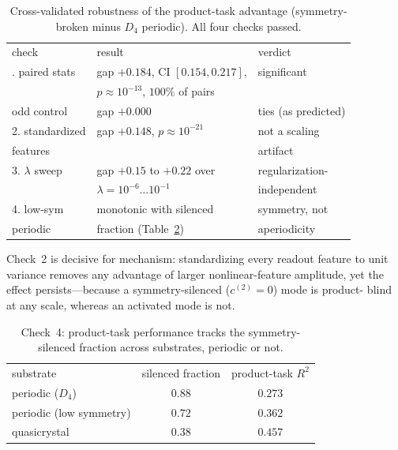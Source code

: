 \documentclass[aps,prapplied,reprint,amsmath,amssymb,floatfix]{revtex4-2}
\begin{document}
\begin{table}[h]
\caption{Cross-validated robustness of the product-task advantage
(symmetry-broken minus $D_4$ periodic). All four checks passed.}
\label{tab:cv}
\begin{ruledtabular}
\begin{tabular}{lll}
check & result & verdict \\
\colrule
1. paired stats   & gap $+0.184$, CI $[0.154,0.217]$, & significant \\
                  & $p\!\approx\!10^{-13}$, $100\%$ of pairs & \\
   odd control    & gap $+0.000$ & ties (as predicted) \\
2. standardized   & gap $+0.148$, $p\!\approx\!10^{-21}$ & not a scaling \\
   features       & & artifact \\
3. $\lambda$ sweep& gap $+0.15$ to $+0.22$ over & regularization- \\
                  & $\lambda=10^{-6}\ldots10^{-1}$ & independent \\
4. low-sym        & monotonic with silenced & symmetry, not \\
   periodic       & fraction (Table~\ref{tab:cv2}) & aperiodicity \\
\end{tabular}
\end{ruledtabular}
\end{table}

Check~2 is decisive for mechanism: standardizing every readout feature to unit
variance removes any advantage of larger nonlinear-feature amplitude, yet the
effect persists---because a symmetry-silenced ($c^{(2)}=0$) mode is product-
blind at any scale, whereas an activated mode is not.

\begin{table}[h]
\caption{Check~4: product-task performance tracks the symmetry-silenced
fraction across substrates, periodic or not.}
\label{tab:cv2}
\begin{ruledtabular}
\begin{tabular}{lcc}
substrate & silenced fraction & product-task $R^2$ \\
\colrule
periodic ($D_4$)        & $0.88$ & $0.273$ \\
periodic (low symmetry) & $0.72$ & $0.362$ \\
quasicrystal            & $0.38$ & $0.457$ \\
\end{tabular}
\end{ruledtabular}
\end{table}
\end{document}
